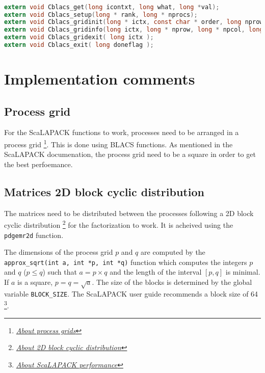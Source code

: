 \documentclass{article}
\begin{document}
\begin{lstlisting}[language=c]

extern void Cblacs_get(long icontxt, long what, long *val);
extern void Cblacs_setup(long * rank, long * nprocs);
extern void Cblacs_gridinit(long * ictx, const char * order, long nprow, long npcol);
extern void Cblacs_gridinfo(long ictx, long * nprow, long * npcol, long * myrow, long * mycol);
extern void Cblacs_gridexit( long ictx );
extern void Cblacs_exit( long doneflag );

\end{lstlisting}

\section{Implementation comments}

\subsection{Process grid}

\par For the ScaLAPACK functions to work, processes need to be arranged in a process grid \footnote{\href{https://netlib.org/scalapack/slug/node33.html\#SECTION04240000000000000000}{\textit{About process grids}}}. This is done using BLACS functions. As mentioned in the ScaLAPACK documenation, the process grid need to be a square in order to get the best perfoemance.

\subsection{Matrices 2D block cyclic distribution}

\par The matrices need to be distributed between the processes following a 2D block cyclic distribution \footnote{\href{https://netlib.org/scalapack/slug/node75.html\#SECTION04431000000000000000}{\textit{About 2D block cyclic distribution}}} for the factorization to work. It is acheived using the \verb |pdgemr2d| function. 
\par The dimensions of the process grid $p$ and $q$ are computed by the \verb |approx_sqrt(int a, int *p, int *q)| function which computes the integers $p$ and $q$ ($p \leq q$) such that $a = p \times q$ and the length of the interval $[p, q]$ is minimal. If $a$ is a square, $p = q = \sqrt a$. The size of the blocks is determined by the global variable \verb |BLOCK_SIZE|. The ScaLAPACK user guide recommends a block size of 64 \footnote{\href{https://netlib.org/scalapack/slug/node106.html\#SECTION04511000000000000000}{\textit{About ScaLAPACK performance}}}. 
\end{document}
